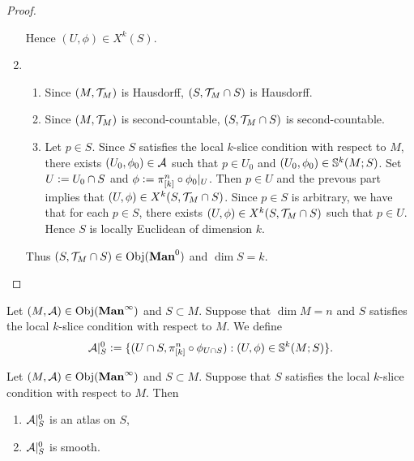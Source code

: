 \documentclass{book}
\begin{document}
\begin{proof}
\begin{enumerate}
\begin{enumerate}
			\end{enumerate}
			Hence $(U, \phi) \in X^k(S)$.
			\item 
			\begin{enumerate}
				\item Since $(M, \MT_M)$ is Hausdorff, $(S, \MT_M \cap S)$ is Hausdorff.
				\item Since $(M, \MT_M)$ is second-countable, $(S, \MT_M \cap S)$ is second-countable.
				\item Let $p \in S$. Since $S$ satisfies the local $k$-slice condition with respect to $M$, there exists $(U_0, \phi_0) \in \MA$ such that $p \in U_0$ and $(U_0, \phi_0) \in \S^k(M; S)$. Set $U \defeq U_0 \cap S$ and $\phi \defeq \pi^n_{[k]} \circ \phi_0|_U$. Then $p \in U$ and the prevous part implies that $(U, \phi) \in X^k(S, \MT_M \cap S)$. Since $p \in S$ is arbitrary, we have that for each $p \in S$, there exists $(U, \phi) \in X^k(S, \MT_M \cap S)$ such that $p \in U$. Hence $S$ is locally Euclidean of dimension $k$. 
			\end{enumerate}
			Thus $(S, \MT_M \cap S) \in \Obj(\Man0)$ and $\dim S = k$.
		\end{enumerate}
	\end{proof}

	\begin{defn}
		Let $(M, \MA) \in \Obj(\Maninf)$ and $S \subset M$. Suppose that $\dim M = n$ and $S$ satisfies the local $k$-slice condition with respect to $M$. We define 
		$$\MA|_S^0 \defeq \{(U \cap S, \pi^n_{[k]} \circ \phi_{U \cap S}): (U, \phi) \in \S^k(M; S)\}.$$
	\end{defn}

	\begin{ex}
		Let $(M, \MA) \in \Obj(\Maninf)$ and $S \subset M$. Suppose that $S$ satisfies the local $k$-slice condition with respect to $M$. Then 
		\begin{enumerate}
			\item $\MA|_S^0$ is an atlas on $S$,
			\item $\MA|_S^0$ is smooth.
		\end{enumerate}
	\end{ex}
	
\end{document}
